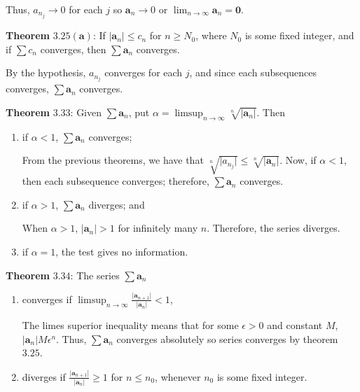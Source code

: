 \begin{enumerate}
  Thus, \(a_{n_j}\to 0\) for each \(j\) so \(\mathbold{a}_n\to 0\) or
  \(\lim_{n\to\infty}\mathbold{a}_n = \mathbold{0}\).
  \par\smallskip
  \textbf{Theorem} \(\mathbold{3.25(a)}\): If
  \(\lvert\mathbold{a}_n\rvert\leq c_n\) for \(n\geq N_0\), where \(N_0\) is
  some fixed integer, and if \(\sum c_n\) converges, then
  \(\sum\mathbold{a}_n\) converges.
  \par\smallskip
  By the hypothesis, \(a_{n_j}\) converges for each \(j\), and since each
  subsequences converges, \(\sum\mathbold{a}_n\) converges.
  \par\smallskip
  \textbf{Theorem} \(\mathbold{3.33}\): Given \(\sum\mathbold{a}_n\), put
  \(\alpha = \limsup_{n\to\infty}\sqrt[n]{\lvert\mathbold{a}_n\vert}\).
  Then
  \begin{enumerate}[label = (\alph*)]
  \item
    if \(\alpha < 1\), \(\sum\mathbold{a}_n\) converges;
    \par\smallskip
    From the previous theorems, we have that
    \(\sqrt[n]{\lvert a_{n_j}\rvert}\leq\sqrt[n]{\lvert\mathbold{a}_n\rvert}\).
    Now, if \(\alpha < 1\), then each subsequence converges; therefore,
    \(\sum\mathbold{a}_n\) converges.
  \item
    if \(\alpha > 1\), \(\sum\mathbold{a}_n\) diverges; and
    \par\smallskip
    When \(\alpha > 1\), \(\lvert\mathbold{a}_n\rvert > 1\) for infinitely
    many \(n\).
    Therefore, the series diverges.
  \item
    if \(\alpha = 1\), the test gives no information.
  \end{enumerate}
  \textbf{Theorem} \(\mathbold{3.34}\): The series \(\sum\mathbold{a}_n\)
  \begin{enumerate}[label = (\alph*)]
  \item
    converges if \(\limsup_{n\to\infty}\frac{\lvert\mathbold{a}_{n + 1}\rvert}
    {\lvert\mathbold{a}_n\rvert} < 1\),
    \par\smallskip
    The limes superior inequality means that for some \(\epsilon > 0\) and
    constant \(M\), \(\lvert\mathbold{a}_n\rvert M\epsilon ^n\).
    Thus, \(\sum\mathbold{a}_n\) converges absolutely so series converges by
    theorem \(3.25\).
  \item
    diverges if \(\frac{\lvert\mathbold{a}_{n + 1}\rvert}
    {\lvert\mathbold{a}_n\rvert}\geq 1\) for \(n\leq n_0\), whenever \(n_0\) is
    some fixed integer.
    \par\smallskip

\end{enumerate}
\end{enumerate}

